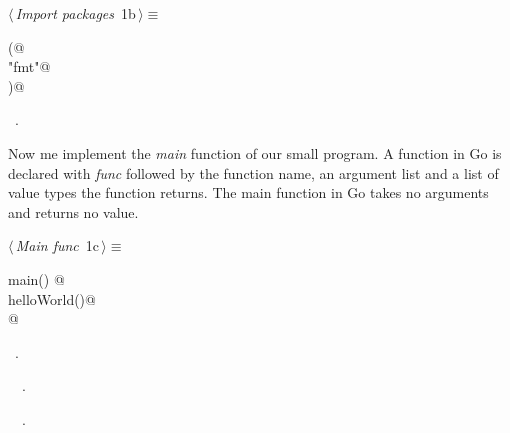 \documentclass[a4paper]{report}
\begin{document}
\begin{flushleft} \small
\begin{minipage}{\linewidth}\label{scrap2}\raggedright\small
{} $\langle\,${\itshape Import packages}\nobreak\ {\footnotesize {1b}}$\,\rangle\equiv$
\vspace{-1ex}
\begin{list}{}{} \item
\mbox{}\verb@import (@\\
\mbox{}\verb@  "fmt"@\\
\mbox{}\verb@)@\\
\mbox{}\verb@@{\NWsep}
\end{list}
\vspace{-1.5ex}
\footnotesize
\begin{list}{}{\setlength{\itemsep}{-\parsep}\setlength{\itemindent}{-\leftmargin}}
\item \NWtxtMacroRefIn\ .

\item{}
\end{list}
\end{minipage}\vspace{4ex}
\end{flushleft}
Now me implement the \emph{main} function of our small program. A function in
Go is declared with \emph{func} followed by the function name, an argument
list and a list of value types the function returns. The main function in Go
takes no arguments and returns no value.
\begin{flushleft} \small
\begin{minipage}{\linewidth}\label{scrap3}\raggedright\small
{} $\langle\,${\itshape Main func}\nobreak\ {\footnotesize {1c}}$\,\rangle\equiv$
\vspace{-1ex}
\begin{list}{}{} \item
\mbox{}\verb@func main() {@\\
\mbox{}\verb@  helloWorld()@\\
\mbox{}\verb@}@\\
\mbox{}\verb@@{\NWsep}
\end{list}
\vspace{-1.5ex}
\footnotesize
\begin{list}{}{\setlength{\itemsep}{-\parsep}\setlength{\itemindent}{-\leftmargin}}
\item \NWtxtMacroRefIn\ .
\item \NWtxtIdentsDefed\nobreak\  \verb@main@\nobreak\ .\item \NWtxtIdentsUsed\nobreak\  \verb@helloWorld@\nobreak\ .
\item{}
\end{list}
\end{minipage}\vspace{4ex}
\end{flushleft}
\end{document}
